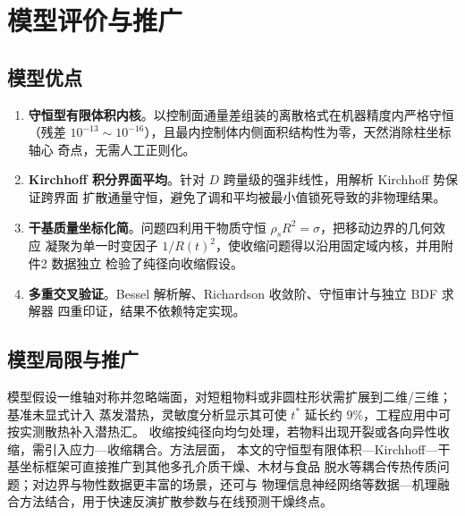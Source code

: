 \section{模型评价与推广}

\subsection{模型优点}

\begin{enumerate}
\item \textbf{守恒型有限体积内核}。以控制面通量差组装的离散格式在机器精度内严格守恒
      （残差 $10^{-13}\sim10^{-16}$），且最内控制体内侧面积结构性为零，天然消除柱坐标轴心
      奇点，无需人工正则化。
\item \textbf{Kirchhoff 积分界面平均}。针对 $D$ 跨量级的强非线性，用解析 Kirchhoff 势保证跨界面
      扩散通量守恒，避免了调和平均被最小值锁死导致的非物理结果。
\item \textbf{干基质量坐标化简}。问题四利用干物质守恒 $\rho_s R^2=\sigma$，把移动边界的几何效应
      凝聚为单一时变因子 $1/R(t)^2$，使收缩问题得以沿用固定域内核，并用附件2 数据独立
      检验了纯径向收缩假设。
\item \textbf{多重交叉验证}。Bessel 解析解、Richardson 收敛阶、守恒审计与独立 BDF 求解器
      四重印证，结果不依赖特定实现。
\end{enumerate}

\subsection{模型局限与推广}

模型假设一维轴对称并忽略端面，对短粗物料或非圆柱形状需扩展到二维/三维；基准未显式计入
蒸发潜热，灵敏度分析显示其可使 $t^*$ 延长约 $9\%$，工程应用中可按实测散热补入潜热汇。
收缩按纯径向均匀处理，若物料出现开裂或各向异性收缩，需引入应力—收缩耦合。方法层面，
本文的守恒型有限体积—Kirchhoff—干基坐标框架可直接推广到其他多孔介质干燥、木材与食品
脱水等耦合传热传质问题；对边界与物性数据更丰富的场景，还可与
物理信息神经网络等数据—机理融合方法结合，用于快速反演扩散参数与在线预测干燥终点。

